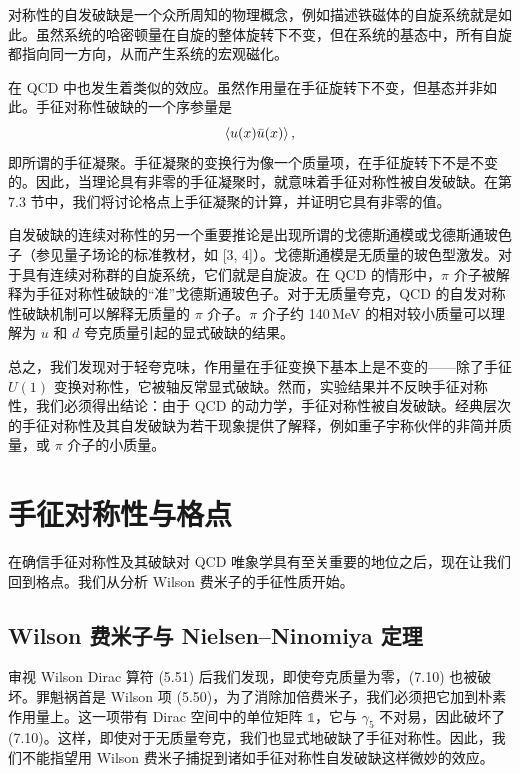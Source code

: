 对称性的自发破缺是一个众所周知的物理概念，例如描述铁磁体的自旋系统就是如此。虽然系统的哈密顿量在自旋的整体旋转下不变，但在系统的基态中，所有自旋都指向同一方向，从而产生系统的宏观磁化。

在 QCD 中也发生着类似的效应。虽然作用量在手征旋转下不变，但基态并非如此。手征对称性破缺的一个序参量是
\begin{equation}
  \left\langle u(x)\bar{u}(x) \right\rangle,
\end{equation}
即所谓的手征凝聚。手征凝聚的变换行为像一个质量项，在手征旋转下不是不变的。因此，当理论具有非零的手征凝聚时，就意味着手征对称性被自发破缺。在第 7.3 节中，我们将讨论格点上手征凝聚的计算，并证明它具有非零的值。

自发破缺的连续对称性的另一个重要推论是出现所谓的戈德斯通模或戈德斯通玻色子（参见量子场论的标准教材，如 [3, 4]）。戈德斯通模是无质量的玻色型激发。对于具有连续对称群的自旋系统，它们就是自旋波。在 QCD 的情形中，$\pi$ 介子被解释为手征对称性破缺的``准''戈德斯通玻色子。对于无质量夸克，QCD 的自发对称性破缺机制可以解释无质量的 $\pi$ 介子。$\pi$ 介子约 140\,MeV 的相对较小质量可以理解为 $u$ 和 $d$ 夸克质量引起的显式破缺的结果。

总之，我们发现对于轻夸克味，作用量在手征变换下基本上是不变的——除了手征 $U(1)$ 变换对称性，它被轴反常显式破缺。然而，实验结果并不反映手征对称性，我们必须得出结论：由于 QCD 的动力学，手征对称性被自发破缺。经典层次的手征对称性及其自发破缺为若干现象提供了解释，例如重子宇称伙伴的非简并质量，或 $\pi$ 介子的小质量。

\section{手征对称性与格点}

在确信手征对称性及其破缺对 QCD 唯象学具有至关重要的地位之后，现在让我们回到格点。我们从分析 Wilson 费米子的手征性质开始。

\subsection{Wilson 费米子与 Nielsen--Ninomiya 定理}

审视 Wilson Dirac 算符 (5.51) 后我们发现，即使夸克质量为零，(7.10) 也被破坏。罪魁祸首是 Wilson 项 (5.50)，为了消除加倍费米子，我们必须把它加到朴素作用量上。这一项带有 Dirac 空间中的单位矩阵 $\mathbb{1}$，它与 $\gamma_5$ 不对易，因此破坏了 (7.10)。这样，即使对于无质量夸克，我们也显式地破缺了手征对称性。因此，我们不能指望用 Wilson 费米子捕捉到诸如手征对称性自发破缺这样微妙的效应。

